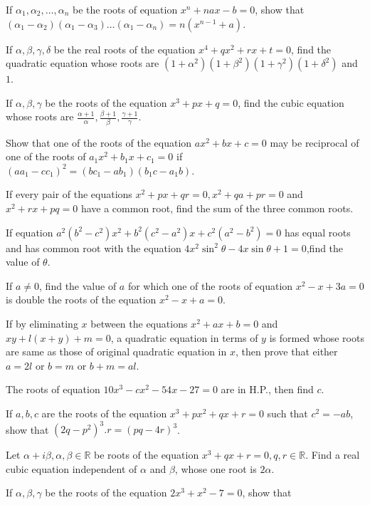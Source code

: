 \item If $\alpha_1, \alpha_2, \ldots, \alpha_n$ be the roots of equation $x^n + nax - b = 0$, show that $(\alpha_1 -
  \alpha_2)(\alpha_1 - \alpha_3)\ldots (\alpha_1 - \alpha_n) = n(x^{n - 1} + a)$.
\item If $\alpha, \beta, \gamma, \delta$ be the real roots of the equation $x^4 + qx^2 + rx + t = 0$, find the quadratic equation
  whose roots are $(1 + \alpha^2)(1 + \beta^2)(1 + \gamma^2)(1 +\delta^2)$ and $1$.
\item If $\alpha, \beta, \gamma$ be the roots of the equation $x^3 + px + q = 0$, find the cubic equation whose roots are
  $\frac{\alpha + 1}{\alpha}, \frac{\beta + 1}{\beta}, \frac{\gamma + 1}{\gamma}$.
\item Show that one of the roots of the equation $ax^2 + bx + c = 0$ may be reciprocal of one of the roots of $a_1x^2 + b_1x +
  c_1 = 0$ if $(aa_1 - cc_1)^2 = (bc_1 - ab_1)(b_1c - a_1b)$.
\item If every pair of the equations $x^2 + px + qr = 0, x^2 + qa + pr = 0$ and $x^2 + rx + pq = 0$ have a common root, find the
  sum of the three common roots.
\item If equation $a^2(b^2 - c^2)x^2 + b^2(c^2 - a^2)x + c^2(a^2 - b^2) = 0$ has equal roots and has common
  root with the equation $4x^2\sin^2\theta - 4x\sin\theta + 1 = 0$,find the value of $\theta$.
\item If $a\neq 0$, find the value of $a$ for which one of the roots of equation $x^2 - x + 3a= 0$ is double the roots of the
  equation $x^2 - x + a = 0$.
\item If by eliminating $x$ between the equations $x^2 + ax + b = 0$ and $xy + l(x + y) + m = 0$, a
  quadratic equation in terms of
  $y$ is formed whose roots are same as those of original quadratic equation in $x$, then prove that either $a = 2l$ or $b = m$ or
  $b + m = al$.
\item The roots of equation $10x^3 - cx^2 - 54x - 27 = 0$ are in H.P., then find $c$.
\item If $a, b, c$ are the roots of the equation $x^3 + px^2 + qx + r = 0$ such that $c^2 = -ab$, show that $(2q - p^2)^3.r = (pq -
  4r)^3$.
\item Let $\alpha + i\beta, \alpha, \beta\in\mathbb{R}$ be roots of the equation $x^3 + qx + r = 0, q, r\in\mathbb{R}$. Find a real
  cubic equation independent of $\alpha$ and $\beta$, whose one root is $2\alpha$.
\item If $\alpha, \beta, \gamma$ be the roots of the equation $2x^3 + x^2 - 7 = 0$, show that
